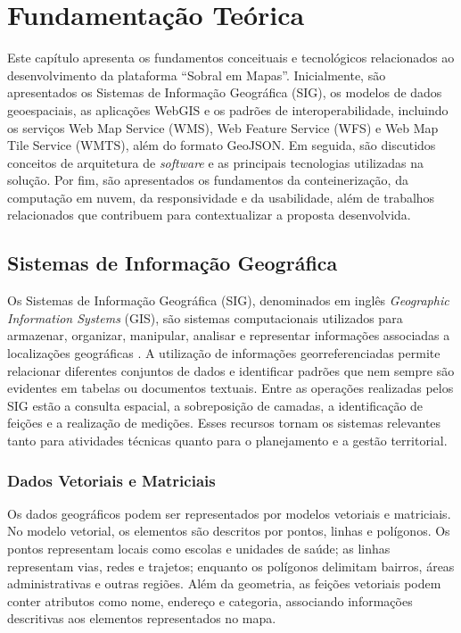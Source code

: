 \chapter{Fundamentação Teórica}
\label{cap:fundamentacao-teorica}

Este capítulo apresenta os fundamentos conceituais e tecnológicos relacionados ao desenvolvimento da plataforma ``Sobral em Mapas''. Inicialmente, são apresentados os Sistemas de Informação Geográfica (SIG), os modelos de dados geoespaciais, as aplicações WebGIS e os padrões de interoperabilidade, incluindo os serviços Web Map Service (WMS), Web Feature Service (WFS) e Web Map Tile Service (WMTS), além do formato GeoJSON. Em seguida, são discutidos conceitos de arquitetura de \textit{software} e as principais tecnologias utilizadas na solução. Por fim, são apresentados os fundamentos da conteinerização, da computação em nuvem, da responsividade e da usabilidade, além de trabalhos relacionados que contribuem para contextualizar a proposta desenvolvida.

\section{Sistemas de Informação Geográfica}
\label{sec:sig}

Os Sistemas de Informação Geográfica (SIG), denominados em inglês \textit{Geographic Information Systems} (GIS), são sistemas computacionais utilizados para armazenar, organizar, manipular, analisar e representar informações associadas a localizações geográficas \cite{Silva2013}.  A utilização de informações georreferenciadas permite relacionar diferentes conjuntos de dados e identificar padrões que nem sempre são evidentes em tabelas ou documentos textuais. Entre as operações realizadas pelos \gls{SIG} estão a consulta espacial, a sobreposição de camadas, a identificação de feições e a realização de medições. Esses recursos tornam os sistemas relevantes tanto para atividades técnicas quanto para o planejamento e a gestão territorial.

\subsection{Dados Vetoriais e Matriciais}
\label{sec:dados-geoespaciais}

Os dados geográficos podem ser representados por modelos vetoriais e matriciais. No modelo vetorial, os elementos são descritos por pontos, linhas e polígonos. Os pontos representam locais como escolas e unidades de saúde; as linhas representam vias, redes e trajetos; enquanto os polígonos delimitam bairros, áreas administrativas e outras regiões. Além da geometria, as feições vetoriais podem conter atributos como nome, endereço e categoria, associando informações descritivas aos elementos representados no mapa.

